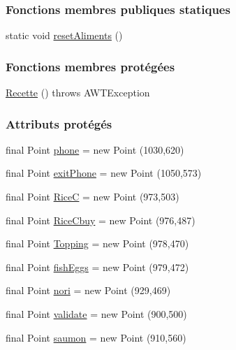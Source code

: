 \subsubsection*{Fonctions membres publiques statiques}
\begin{DoxyCompactItemize}
\item 
static void \hyperlink{classSuchi_1_1Recette_a99446c824f7bffe26c36e8433a4b18b3}{reset\+Aliments} ()
\end{DoxyCompactItemize}
\subsubsection*{Fonctions membres protégées}
\begin{DoxyCompactItemize}
\item 
\hyperlink{classSuchi_1_1Recette_a1d04b2e6c690dfc928cbd7b7c77dec02}{Recette} ()  throws A\+W\+T\+Exception
\end{DoxyCompactItemize}
\subsubsection*{Attributs protégés}
\begin{DoxyCompactItemize}
\item 
final Point \hyperlink{classSuchi_1_1Recette_a89465932bd180079526cfc1f8b8af456}{phone} = new Point (1030,620)
\item 
final Point \hyperlink{classSuchi_1_1Recette_ac7ff51ea8fa06174c38c52121b0ef767}{exit\+Phone} = new Point (1050,573)
\item 
final Point \hyperlink{classSuchi_1_1Recette_a36ec8dc3a30b3f1dba74d3aa354f9f11}{Rice\+C} = new Point (973,503)
\item 
final Point \hyperlink{classSuchi_1_1Recette_afc63b1a3fa7d921d606dc0c99d52cdf4}{Rice\+Cbuy} = new Point (976,487)
\item 
final Point \hyperlink{classSuchi_1_1Recette_a4810b2254c050209fba27757066668b3}{Topping} = new Point (978,470)
\item 
final Point \hyperlink{classSuchi_1_1Recette_a9d19fcc0de54e124694592bc35d97a1d}{fish\+Eggs} = new Point (979,472)
\item 
final Point \hyperlink{classSuchi_1_1Recette_ab86193f9fe4491190e232c4e7f93bed5}{nori} = new Point (929,469)
\item 
final Point \hyperlink{classSuchi_1_1Recette_aff16265c9b0b819091af71f64ef84be7}{validate} = new Point (900,500)
\item 
final Point \hyperlink{classSuchi_1_1Recette_a17aeabd21e3d4d55d7caae9a40bfc6a1}{saumon} = new Point (910,560)
\end{DoxyCompactItemize}
